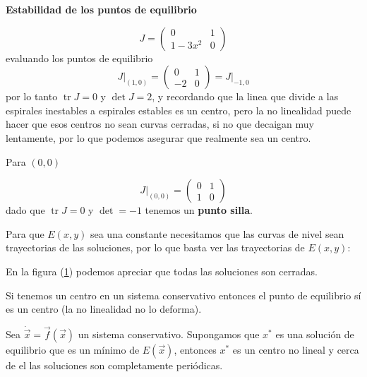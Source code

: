\textbf{Estabilidad de los puntos de equilibrio}

\begin{equation*}
	J= \begin{pmatrix} 0 & 1 \\ 1-3x^2 & 0 \end{pmatrix} 
\end{equation*}
evaluando los puntos de equilibrio
\begin{equation*}
  \left. J \right|_{(1,0)} = \begin{pmatrix} 0 &  1 \\ -2 & 0 \end{pmatrix} = \left. J \right|_{-1,0} 
\end{equation*}
por lo tanto $ \operatorname{tr}J=0$ y $ \operatorname{det} J = 2$, y recordando que la linea que divide a las espirales inestables a espirales estables es un centro, pero la no linealidad puede hacer que esos centros no sean curvas cerradas, si no que decaigan muy lentamente, por lo que podemos asegurar que realmente sea un centro. 

Para $(0,0)$

\begin{equation*}
  \left. J \right|_{(0,0)} = \begin{pmatrix} 0 & 1 \\ 1 & 0 \end{pmatrix}    
\end{equation*}
dado que $\operatorname{tr}J=0$ y $\operatorname{det}=-1$ tenemos un \textbf{punto silla}.

Para que $E(x,y)$ sea una constante necesitamos que las curvas de nivel sean trayectorias de las soluciones, por lo que basta ver las trayectorias de $E(x,y)$:

\begin{figure}[H]
 \centering
    \caption{}
 \label{scr-im1}
\end{figure} 
En la figura (\ref{scr-im1}) podemos apreciar que todas las soluciones son cerradas.

\begin{tcolorbox}[colback=Black!4, colframe=White,arc=2mm]
\begin{teorema} Si tenemos un centro en un sistema conservativo entonces el punto de equilibrio sí es un centro (la no linealidad no lo deforma).
  \vspace{2mm}

  Sea $\dot{\vec{x}} = \vec{f}(\vec{x})$ un sistema conservativo. Supongamos que $x^*$ es una solución de equilibrio que es un mínimo de $E(\vec{x})$, entonces $x^*$ es un centro no lineal y cerca de el las soluciones son completamente periódicas.
\end{teorema}
\end{tcolorbox}

